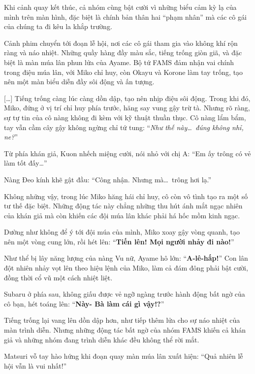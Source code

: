 \documentclass[../main.tex]{subfiles}
\begin{document}
Khi cảnh quay kết thúc, cả nhóm cùng bật cười vì những biểu cảm kỳ lạ của mình trên màn hình, đặc biệt là chính bản thân hai ``phạm nhân'' mà các cô gái của chúng ta đi kêu la khắp trường.

Cảnh phim chuyển tới đoạn lễ hội, nơi các cô gái tham gia vào không khí rộn ràng và náo nhiệt. Những quầy hàng đầy màu sắc, tiếng trống giòn giã, và đặc biệt là màn múa lân phun lửa của Ayame. Bộ tứ FAMS đảm nhận vai chính trong điệu múa lân, với Miko chỉ huy, còn Okayu và Korone làm tay trống, tạo nên một màn biểu diễn đầy sôi động và ấn tượng.

\il

[\dots] Tiếng trống càng lúc càng dồn dập, tạo nên nhịp điệu sôi động. Trong khi đó, Miko, đứng ở vị trí chỉ huy phía trước, hăng say vung gậy trừ tà. Nhưng rõ ràng, sự tự tin của cô nàng không đi kèm với kỹ thuật thuần thục. Cô nàng lẩm bẩm, tay vẫn cầm cây gậy không ngừng chỉ tứ tung: ``\textit{Như thế này\dots\ đúng không nhỉ, ne?}''

Từ phía khán giả, Kuon nhếch miệng cười, nói nhỏ với chị A: ``{Em ấy trông có vẻ làm tốt đấy\dots}''

Nàng Đeo kính khẽ gật đầu: ``Công nhận. Nhưng mà\dots\ trông hơi lạ.''

Không những vậy, trong lúc Miko hăng hái chỉ huy, cô còn vô tình tạo ra một số tư thế đặc biệt. Những động tác này chẳng những thu hút ánh mắt ngạc nhiên của khán giả mà còn khiến các đội múa lân khác phải há hốc mồm kinh ngạc.

Dường như không để ý tới đội múa của mình, Miko xoay gậy vòng quanh, tạo nên một vòng cung lớn, rồi hét lên: ``\textbf{Tiến lên! Mọi người nhảy đi nào!}''

Như thể bị lây năng lượng của nàng Vu nữ, Ayame hô lớn: ``\textbf{A-lê-hấp!}'' Con lân đột nhiên nhảy vọt lên theo hiệu lệnh của Miko, làm cả đám đông phải bật cười, đồng thời cổ vũ một cách nhiệt liệt.

Subaru ở phía sau, không giấu được vẻ ngỡ ngàng trước hành động bất ngờ của cô bạn, hét toáng lên: ``\textbf{Này- Bà làm cái gì vậy!?}''

Tiếng trống lại vang lên dồn dập hơn, như tiếp thêm lửa cho sự náo nhiệt của màn trình diễn. Nhưng những động tác bất ngờ của nhóm FAMS khiến cả khán giả và những nhóm đang trình diễn khác đều không thể rời mắt.

\il

Matsuri vỗ tay hào hứng khi đoạn quay màn múa lân xuất hiện: ``Quả nhiên lễ hội vẫn là vui nhất!''
\end{document}
